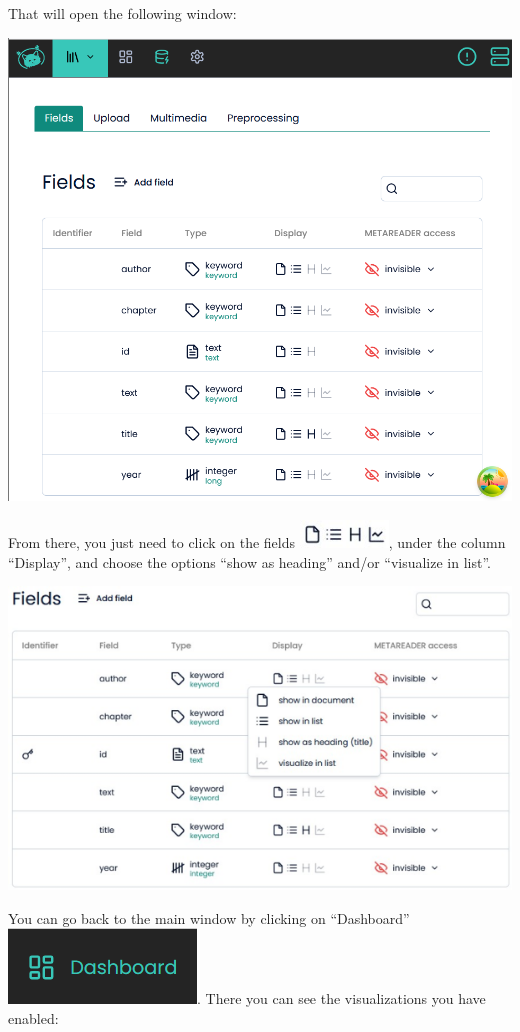 \documentclass[
  letterpaper,
  DIV=11,
  numbers=noendperiod]{scrreprt}
\begin{document}
That will open the following window:

\includegraphics{media/amcat-3.2-2.png}

From there, you just need to click on the fields
\includegraphics{media/amcat-3.2-3.png}, under the column ``Display'',
and choose the options ``show as heading'' and/or ``visualize in list''.

\includegraphics{media/amcat-3.2-4.png}

You can go back to the main window by clicking on ``Dashboard''
\includegraphics{media/amcat-3.2-5.png}. There you can see the
visualizations you have enabled:
\end{document}
